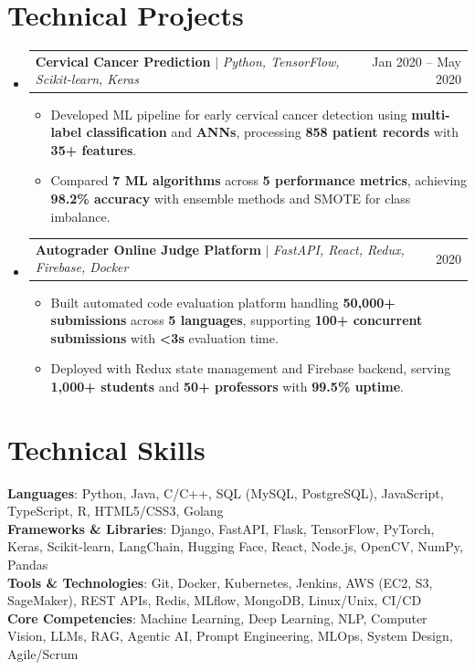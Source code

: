 \documentclass[letterpaper,10pt]{article}
\makeatletter
\newcommand{\resumeItem}[1]{
  \item\small{
    {#1 \vspace{-3.5pt}}
  }
}
\newcommand{\resumeProjectHeading}[2]{
    \item
    \begin{tabular*}{0.99\textwidth}{l@{\extracolsep{\fill}}r}
      \small#1 & #2 \\
    \end{tabular*}\vspace{-7pt}
}
\newcommand{\resumeSubHeadingListStart}{\begin{itemize}[leftmargin=0.015in, label={}]}
\newcommand{\resumeSubHeadingListEnd}{\end{itemize}}
\newcommand{\resumeItemListStart}{\begin{itemize}[leftmargin=0.15in]}
\newcommand{\resumeItemListEnd}{\end{itemize}\vspace{-6pt}}
\makeatother
\begin{document}
\section{Technical Projects}
    \resumeSubHeadingListStart
      \resumeProjectHeading
          {\textbf{Cervical Cancer Prediction} $|$ \emph{Python, TensorFlow, Scikit-learn, Keras}}{Jan 2020 -- May 2020}
          \resumeItemListStart
            \resumeItem{Developed ML pipeline for early cervical cancer detection using \textbf{multi-label classification} and \textbf{ANNs}, processing \textbf{858 patient records} with \textbf{35+ features}.}
            \resumeItem{Compared \textbf{7 ML algorithms} across \textbf{5 performance metrics}, achieving \textbf{98.2\% accuracy} with ensemble methods and SMOTE for class imbalance.}
          \resumeItemListEnd
      \resumeProjectHeading
          {\textbf{Autograder Online Judge Platform} $|$ \emph{FastAPI, React, Redux, Firebase, Docker}}{2020}
          \resumeItemListStart
            \resumeItem{Built automated code evaluation platform handling \textbf{50,000+ submissions} across \textbf{5 languages}, supporting \textbf{100+ concurrent submissions} with \textbf{<3s} evaluation time.}
            \resumeItem{Deployed with Redux state management and Firebase backend, serving \textbf{1,000+ students} and \textbf{50+ professors} with \textbf{99.5\% uptime}.}
          \resumeItemListEnd
    \resumeSubHeadingListEnd

\section{Technical Skills}
 \begin{itemize}[leftmargin=0.015in, label={}]
    \small{\item{
     \textbf{Languages}{: Python, Java, C/C++, SQL (MySQL, PostgreSQL), JavaScript, TypeScript, R, HTML5/CSS3, Golang} \\
     \textbf{Frameworks \& Libraries}{: Django, FastAPI, Flask, TensorFlow, PyTorch, Keras, Scikit-learn, LangChain, Hugging Face, React, Node.js, OpenCV, NumPy, Pandas} \\
     \textbf{Tools \& Technologies}{: Git, Docker, Kubernetes, Jenkins, AWS (EC2, S3, SageMaker), REST APIs, Redis, MLflow, MongoDB, Linux/Unix, CI/CD} \\
     \textbf{Core Competencies}{: Machine Learning, Deep Learning, NLP, Computer Vision, LLMs, RAG, Agentic AI, Prompt Engineering, MLOps, System Design, Agile/Scrum}
    }}
 \end{itemize}
\end{document}
